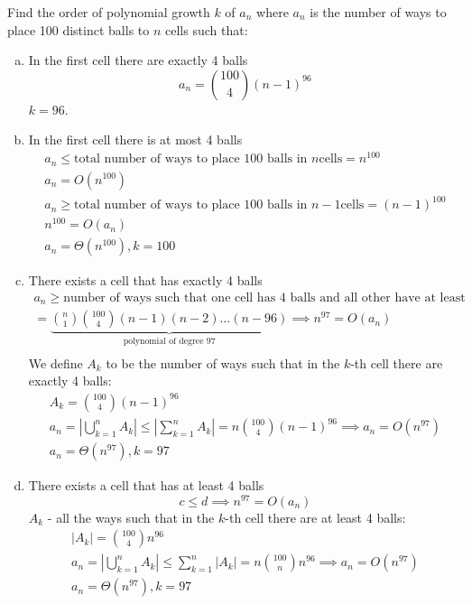 \documentclass[00_complete]{subfiles}
\begin{document}
\begin{example}
    Find the order of polynomial growth $k$ of $a_n$ where $a_n$ is the number of
    ways to place 100 distinct balls to $n$ cells such that:
    \begin{enumerate}[a.]
        \item In the first cell there are exactly 4 balls
        $$a_n = \binom{100}{4}(n-1)^{96}$$
        $k=96$.
        \item In the first cell there is at most 4 balls
        \begin{gather*}
            a_n \leq \text{total number of ways to place $100$ balls in $n$
            cells} = n^{100} \\
            a_n = O(n^{100}) \tag{I} \\
            a_n \geq \text{total number of ways to place $100$ balls in $n-1$
            cells} = (n-1)^{100} \\
            n^{100} = O(a_n) \tag{II} \\
            a_n=\Theta(n^{100}), k=100
        \end{gather*}
        \item There exists a cell that has exactly 4 balls
        \begin{gather*}
        a_n \geq \text{number of ways such that one cell has 4 balls and all other
        have at least one} \\
        =\underbrace{\binom{n}{1}\binom{100}{4}(n-1)(n-2)\dots(n-96)}_{\text{polynomial
        of degree 97}} \implies n^{97} = O(a_n) \tag{I} \\
        \end{gather*}
        We define $A_k$ to be the number of ways such that in the $k$-th cell
        there are exactly 4 balls:
        \begin{gather*}
            A_k=\binom{100}{4}(n-1)^{96} \\
            a_n = \left|\bigcup_{k=1}^{n} A_k \right| \leq
            \left|\sum_{k=1}^{n}A_k\right| = n\binom{100}{4}(n-1)^{96} \implies
            a_n =O(n^{97}) \\
            a_n =\Theta(n^{97}), k=97
        \end{gather*}
        \item There exists a cell that has at least 4 balls
        $$c \leq d \implies n^{97} = O(a_n)$$
        $A_k$ - all the ways such that in the $k$-th cell there are at least 4
        balls:
        \begin{gather*}
            |A_k|=\binom{100}{4}n^{96} \\
            a_n=\left|\bigcup_{k=1}^nA_k\right|\leq\sum_{k=1}^{n}|A_k|
            = n\binom{100}{n}n^{96} \implies a_n = O(n^{97}) \\
            a_n = \Theta(n^{97}), k=97
        \end{gather*}
    \end{enumerate}
\end{example}
\end{document}
